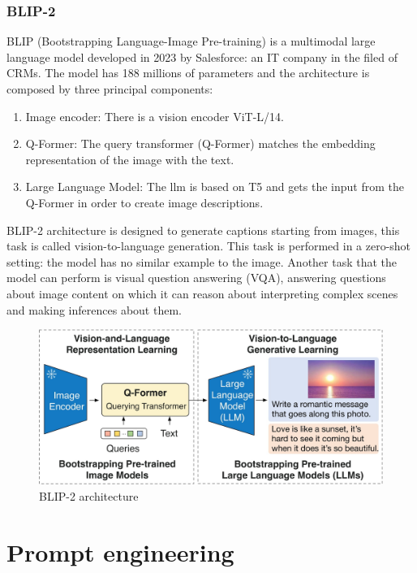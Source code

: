 \subsubsection{BLIP-2}
BLIP (Bootstrapping Language-Image Pre-training) is a multimodal large language model developed in 2023 by Salesforce: an IT company in the filed of CRMs.
The model has 188 millions of parameters and the architecture is composed by three principal components:
\begin{enumerate}
    \item Image encoder: There is a vision encoder ViT-L/14.

    \item Q-Former: The query transformer (Q-Former) matches the embedding representation of the image with the text.

    \item Large Language Model: The llm is based on T5 and gets the input from the Q-Former in order to create image descriptions.
\end{enumerate}
BLIP-2 architecture is designed to generate captions starting from images, this task is called vision-to-language generation. This task is performed in a zero-shot setting: the model has no similar example to the image. Another task that the model can perform is visual question answering (VQA), answering questions about image content on which it can reason about interpreting complex scenes and making inferences about them. 
\begin{figure}[H]
    \centering
    \includegraphics[width=0.7\linewidth]{Figures/fig_24.jpg}
    \caption{BLIP-2 architecture}
    \label{fig:enter-label}
\end{figure}
\newpage
\section{Prompt engineering}
\label{section:2_4_prompt_engineering}
